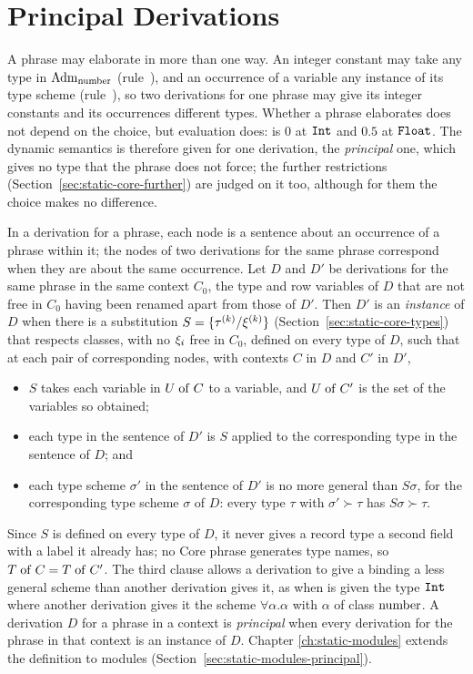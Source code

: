 \section{Principal Derivations}\label{sec:static-core-principal}

A phrase may elaborate in more than one way. An integer constant may take any
type in $\mathrm{Adm}_{\mathrm{number}}$ (rule~), and an occurrence of a
variable any instance of its type scheme (rule~),
so two derivations for one phrase may give its integer constants and its
occurrences different types. Whether a phrase elaborates does not depend on the
choice, but evaluation does:  is $0$ at $\mathtt{Int}$
and $0.5$ at $\mathtt{Float}$. The dynamic semantics is therefore given for one
derivation, the \emph{principal} one, which gives no type that the phrase does
not force; the further restrictions (Section~\ref{sec:static-core-further}) are
judged on it too, although for them the choice makes no difference. %

In a derivation for a phrase, each node is a sentence about an occurrence of a
phrase within it; the nodes of two derivations for the same phrase correspond
when they are about the same occurrence. Let $D$ and $D'$ be derivations for
the same phrase in the same context $C_0$, the type and row variables of $D$
that are not free in $C_0$ having been renamed apart from those of $D'$. Then
$D'$ is an \emph{instance} of $D$ when there is a substitution
$S = \{\tau^{(k)}/\xi^{(k)}\}$ (Section~\ref{sec:static-core-types}) that
respects classes, with no $\xi_i$ free in $C_0$, defined on every type of
$D$, such that at each pair of corresponding nodes, with contexts $C$ in $D$ and
$C'$ in $D'$,
\begin{itemize}
\item $S$ takes each variable in $U \mathrel{\mathrm{of}} C$ to a variable, and $U \mathrel{\mathrm{of}} C'$ is the
  set of the variables so obtained;
\item each type in the sentence of $D'$ is $S$ applied to the corresponding
  type in the sentence of $D$; and
\item each type scheme $\sigma'$ in the sentence of $D'$ is no more general
  than $S\sigma$, for the corresponding type scheme $\sigma$ of $D$: every type
  $\tau$ with $\sigma' \succ \tau$ has $S\sigma \succ \tau$.
\end{itemize}
Since $S$ is defined on every type of $D$, it never gives a record type a
second field with a label it already has; no Core phrase generates type names,
so $T \mathrel{\mathrm{of}} C = T \mathrel{\mathrm{of}} C'$. The third clause allows a derivation to give a binding
a less general scheme than another derivation gives it, as when
 is given the type $\mathtt{Int}$ where another
derivation gives it the scheme $\forall\alpha.\alpha$ with $\alpha$ of class
$\mathrm{number}$. A derivation $D$ for a phrase in a context is \emph{principal} when
every derivation for the phrase in that context is an instance of $D$. Chapter
\ref{ch:static-modules} extends the definition to modules
(Section~\ref{sec:static-modules-principal}).

